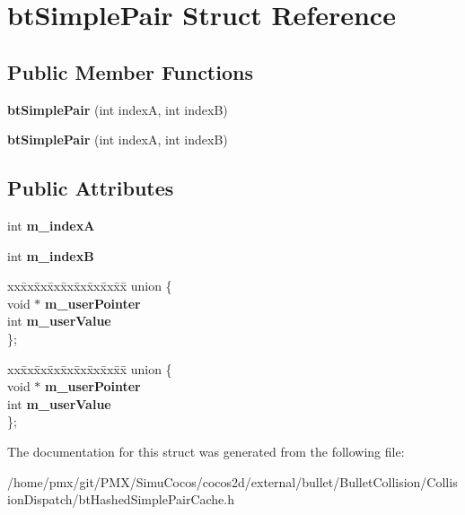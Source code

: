 \hypertarget{structbtSimplePair}{}\section{bt\+Simple\+Pair Struct Reference}
\label{structbtSimplePair}
\subsection*{Public Member Functions}
\begin{DoxyCompactItemize}
\item 
\mbox{\label{structbtSimplePair_a8e32b6a7a75c1e5fbc6df0122b3ef3b3}} 
{\bfseries bt\+Simple\+Pair} (int indexA, int indexB)
\item 
\mbox{\label{structbtSimplePair_a8e32b6a7a75c1e5fbc6df0122b3ef3b3}} 
{\bfseries bt\+Simple\+Pair} (int indexA, int indexB)
\end{DoxyCompactItemize}
\subsection*{Public Attributes}
\begin{DoxyCompactItemize}
\item 
\mbox{\label{structbtSimplePair_a791181ad5f998d6a00fd41d3332cbb2b}} 
int {\bfseries m\+\_\+indexA}
\item 
\mbox{\label{structbtSimplePair_ac3f94cf5224663af0d47e1f7cea0e10b}} 
int {\bfseries m\+\_\+indexB}
\item 
\mbox{\label{structbtSimplePair_a8b944e2af092605e4a89ed13e6b27a27}} 
\begin{tabbing}
xx\=xx\=xx\=xx\=xx\=xx\=xx\=xx\=xx\=\kill
union \{\\
\>void $\ast$ {\bfseries m\_userPointer}\\
\>int {\bfseries m\_userValue}\\
\}; \\

\end{tabbing}\item 
\mbox{\label{structbtSimplePair_aebc9a732166210720feb254e22ed146f}} 
\begin{tabbing}
xx\=xx\=xx\=xx\=xx\=xx\=xx\=xx\=xx\=\kill
union \{\\
\>void $\ast$ {\bfseries m\_userPointer}\\
\>int {\bfseries m\_userValue}\\
\}; \\

\end{tabbing}\end{DoxyCompactItemize}


The documentation for this struct was generated from the following file\+:\begin{DoxyCompactItemize}
\item 
/home/pmx/git/\+P\+M\+X/\+Simu\+Cocos/cocos2d/external/bullet/\+Bullet\+Collision/\+Collision\+Dispatch/bt\+Hashed\+Simple\+Pair\+Cache.\+h\end{DoxyCompactItemize}
